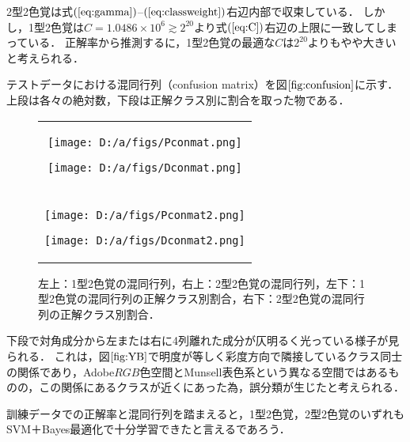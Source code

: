 \documentclass[uplatex,paper=a4,fontsize=4.0truemm,jafontsize=4.0truemm,head_space=30.0truemm,foot_space=30.0truemm,baselineskip=8.0truemm,line_length=40zw,gutter=25.0truemm,oneside,openany,fleqn,hanging_panctuation,open_bracket_pos=nibu_tentsuki,dvipdfmx,jis2004,book,titlepage]{jlreq}
\theoremstyle{mystyle}
\newcommand{\captiondot}[1]{\caption{#1．}}
\newcommand{\mathdisplaystyle}[1]{\(\displaystyle{#1}\)}
\newcommand{\Reference}[1]{\mathdisplaystyle{\ref{#1}}}
\newcommand{\Equationreference}[1]{\mathdisplaystyle{\parentheses{\ref{#1}}}}
\newcommand{\parentheses}[1]{\left(#1\right)}
\begin{document}
				2型2色覚は式\Equationreference{eq:gamma}--\Equationreference{eq:classweight}右辺内部で収束している．
				しかし，1型2色覚は\mathdisplaystyle{C=1.0486\times10^6\gtrsim2^{20}}より式\Equationreference{eq:C}右辺の上限に一致してしまっている．
				正解率から推測するに，1型2色覚の最適な\mathdisplaystyle{C}は\mathdisplaystyle{2^{20}}よりもやや大きいと考えられる．

				テストデータにおける混同行列（confusion matrix）を図\Reference{fig:confusion}に示す．
				上段は各々の絶対数，下段は正解クラス別に割合を取った物である．
				\begin{figure}[tbp]
					\centering
					\begin{tabular}{c}
						\begin{minipage}{0.5\linewidth}
							\centering
							\texttt{[image: D:/a/figs/Pconmat.png]}
						\end{minipage}
						\begin{minipage}{0.5\linewidth}
							\centering
							\texttt{[image: D:/a/figs/Dconmat.png]}
						\end{minipage} \\
						\begin{minipage}{0.06\linewidth}
							\vspace{10truemm}
						\end{minipage} \\
						\begin{minipage}{0.5\linewidth}
							\centering
							\texttt{[image: D:/a/figs/Pconmat2.png]}
						\end{minipage}
						\begin{minipage}{0.5\linewidth}
							\centering
							\texttt{[image: D:/a/figs/Dconmat2.png]}
						\end{minipage}
					\end{tabular}
					\captiondot{左上：1型2色覚の混同行列，右上：2型2色覚の混同行列，左下：1型2色覚の混同行列の正解クラス別割合，右下：2型2色覚の混同行列の正解クラス別割合}\label{fig:confusion}
				\end{figure}
				下段で対角成分から左または右に4列離れた成分が仄明るく光っている様子が見られる．
				これは，図\Reference{fig:YB}で明度が等しく彩度方向で隣接しているクラス同士の関係であり，Adobe\mathdisplaystyle{RGB}色空間とMunsell表色系という異なる空間ではあるものの，この関係にあるクラスが近くにあった為，誤分類が生じたと考えられる．

				訓練データでの正解率と混同行列を踏まえると，1型2色覚，2型2色覚のいずれもSVM＋Bayes最適化で十分学習できたと言えるであろう．
\end{document}
